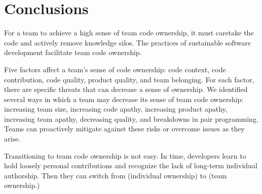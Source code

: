\section{Conclusions}
For a team to achieve a high sense of team code ownership, it must caretake the code and actively remove knowledge silos. The practices of sustainable software development facilitate team code ownership.

Five factors affect a team's sense of code ownership: code context, code contribution, code quality, product quality, and team belonging. For each factor, there are specific threats that can decrease a sense of ownership. We identified several ways in which a team may decrease its sense of team code ownership: increasing team size, increasing code apathy, increasing product apathy, increasing team apathy, decreasing quality, and breakdowns in pair programming. Teams can proactively mitigate against these risks or overcome issues as they arise. 

Transitioning to team code ownership is not easy. In time, developers learn to hold loosely personal contributions and recognize the lack of long-term individual authorship. Then they can switch from  (individual ownership) to  (team ownership.) 




